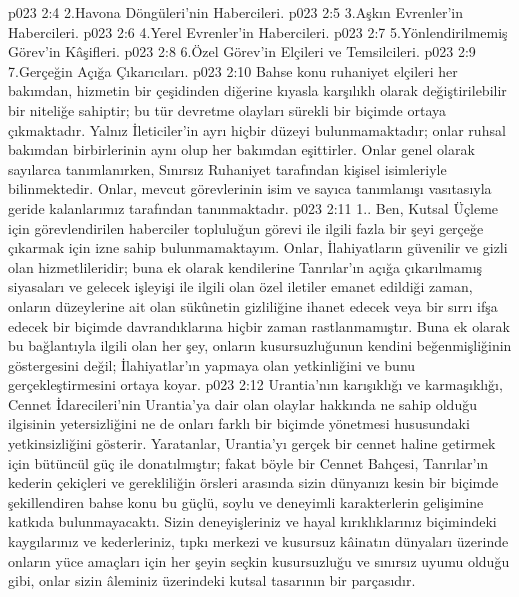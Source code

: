 \vs p023 2:4 2.\bibnobreakspace Havona Döngüleri’nin Habercileri.
\vs p023 2:5 3.\bibnobreakspace Aşkın Evrenler’in Habercileri.
\vs p023 2:6 4.\bibnobreakspace Yerel Evrenler’in Habercileri.
\vs p023 2:7 5.\bibnobreakspace Yönlendirilmemiş Görev’in Kâşifleri.
\vs p023 2:8 6.\bibnobreakspace Özel Görev’in Elçileri ve Temsilcileri.
\vs p023 2:9 7.\bibnobreakspace Gerçeğin Açığa Çıkarıcıları.
\vs p023 2:10 Bahse konu ruhaniyet elçileri her bakımdan, hizmetin bir çeşidinden diğerine kıyasla karşılıklı olarak değiştirilebilir bir niteliğe sahiptir; bu tür devretme olayları sürekli bir biçimde ortaya çıkmaktadır. Yalnız İleticiler’in ayrı hiçbir düzeyi bulunmamaktadır; onlar ruhsal bakımdan birbirlerinin aynı olup her bakımdan eşittirler. Onlar genel olarak sayılarca tanımlanırken, Sınırsız Ruhaniyet tarafından kişisel isimleriyle bilinmektedir. Onlar, mevcut görevlerinin isim ve sayıca tanımlanışı vasıtasıyla geride kalanlarımız tarafından tanınmaktadır.
\vs p023 2:11 1.\bibnobreakspace {}. Ben, Kutsal Üçleme için görevlendirilen haberciler topluluğun görevi ile ilgili fazla bir şeyi gerçeğe çıkarmak için izne sahip bulunmamaktayım. Onlar, İlahiyatların güvenilir ve gizli olan hizmetlileridir; buna ek olarak kendilerine Tanrılar’ın açığa çıkarılmamış siyasaları ve gelecek işleyişi ile ilgili olan özel iletiler emanet edildiği zaman, onların düzeylerine ait olan sükûnetin gizliliğine ihanet edecek veya bir sırrı ifşa edecek bir biçimde davrandıklarına hiçbir zaman rastlanmamıştır. Buna ek olarak bu bağlantıyla ilgili olan her şey, onların kusursuzluğunun kendini beğenmişliğinin göstergesini değil; İlahiyatlar’ın  yapmaya olan yetkinliğini ve bunu gerçekleştirmesini ortaya koyar.
\vs p023 2:12 Urantia’nın karışıklığı ve karmaşıklığı, Cennet İdarecileri’nin Urantia’ya dair olan olaylar hakkında ne sahip olduğu ilgisinin yetersizliğini ne de onları farklı bir biçimde yönetmesi hususundaki yetkinsizliğini gösterir. Yaratanlar, Urantia’yı gerçek bir cennet haline getirmek için bütüncül güç ile donatılmıştır; fakat böyle bir Cennet Bahçesi, Tanrılar’ın kederin çekiçleri ve gerekliliğin örsleri arasında sizin dünyanızı kesin bir biçimde şekillendiren bahse konu bu güçlü, soylu ve deneyimli karakterlerin gelişimine katkıda bulunmayacaktı. Sizin deneyişleriniz ve hayal kırıklıklarınız biçimindeki kaygılarınız ve kederleriniz, tıpkı merkezi ve kusursuz kâinatın dünyaları üzerinde onların yüce amaçları için her şeyin seçkin kusursuzluğu ve sınırsız uyumu olduğu gibi, onlar sizin âleminiz üzerindeki kutsal tasarının bir parçasıdır.

